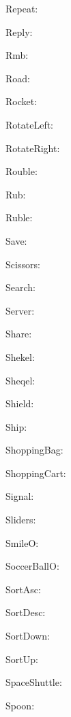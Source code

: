 \documentclass{article}
\begin{document}
      Repeat: \faRepeat\ 

      Reply: \faReply\ 

      Rmb: \faRmb\ 

      Road: \faRoad\ 

      Rocket: \faRocket\ 

      RotateLeft: \faRotateLeft\ 

      RotateRight: \faRotateRight\ 

      Rouble: \faRouble\ 

      Rub: \faRub\ 

      Ruble: \faRuble\ 

      Save: \faSave\ 

      Scissors: \faScissors\ 

      Search: \faSearch\ 

      Server: \faServer\ 

      Share: \faShare\ 

      Shekel: \faShekel\ 

      Sheqel: \faSheqel\ 

      Shield: \faShield\ 

      Ship: \faShip\ 

      ShoppingBag: \faShoppingBag\ 

      ShoppingCart: \faShoppingCart\ 

      Signal: \faSignal\ 

      Sliders: \faSliders\ 

      SmileO: \faSmileO\ 

      SoccerBallO: \faSoccerBallO\ 

      SortAsc: \faSortAsc\ 

      SortDesc: \faSortDesc\ 

      SortDown: \faSortDown\ 

      SortUp: \faSortUp\ 

      SpaceShuttle: \faSpaceShuttle\ 

      Spoon: \faSpoon\ 
\end{document}
